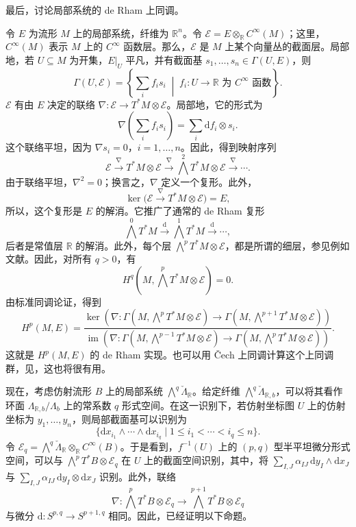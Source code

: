 最后，讨论局部系统的 de Rham 上同调。

令 $E$ 为流形 $M$ 上的局部系统，纤维为 $\mathbb R^n$。令 $\mathcal E=E\otimes_{\mathbb R}C^\infty(M)$；这里，$C^\infty(M)$ 表示 $M$ 上的 $C^\infty$ 函数层。那么，$\mathcal E$ 是 $M$ 上某个向量丛的截面层。局部地，若 $U\subseteq M$ 为开集，$E|_U$ 平凡，并有截面基 $s_1,\ldots,s_n\in\Gamma(U,E)$，则
\[
\Gamma(U,\mathcal E)=\left\{\sum_i f_i s_i\;\middle|\;
f_i\colon U\to\mathbb R\text{ 为 }C^\infty\text{ 函数}\right\}.
\]
$\mathcal E$ 有由 $E$ 决定的联络 $\nabla\colon\mathcal E\to T^*M\otimes\mathcal E$。局部地，它的形式为
\[
\nabla\!\left(\sum_i f_i s_i\right)=\sum_i\mathrm df_i\otimes s_i.
\]
这个联络平坦，因为 $\nabla s_i=0$，$i=1,\ldots,n$。因此，得到映射序列
\[
\mathcal E\xrightarrow{\nabla}T^*M\otimes\mathcal E
\xrightarrow{\nabla}\bigwedge^2T^*M\otimes\mathcal E
\xrightarrow{\nabla}\cdots.
\]
由于联络平坦，$\nabla^2=0$；换言之，$\nabla$ 定义一个复形。此外，
\[
\ker\bigl(\mathcal E\xrightarrow{\nabla}T^*M\otimes\mathcal E\bigr)=E,
\]
所以，这个复形是 $E$ 的解消。它推广了通常的 de Rham 复形
\[
\bigwedge^0T^*M\xrightarrow{\mathrm d}\bigwedge^1T^*M
\xrightarrow{\mathrm d}\cdots,
\]
后者是常值层 $\mathbb R$ 的解消。此外，每个层 $\bigwedge^pT^*M\otimes\mathcal E$，都是所谓的细层，参见例如文献。因此，对所有 $q>0$，有
\[
H^q\!\left(M,\bigwedge^pT^*M\otimes\mathcal E\right)=0.
\]
由标准同调论证，得到
\[
H^p(M,E)=
\frac{\ker\!\left(\nabla\colon\Gamma(M,\bigwedge^pT^*M\otimes\mathcal E)
\to\Gamma(M,\bigwedge^{p+1}T^*M\otimes\mathcal E)\right)}
{\operatorname{im}\!\left(\nabla\colon\Gamma(M,\bigwedge^{p-1}T^*M\otimes\mathcal E)
\to\Gamma(M,\bigwedge^pT^*M\otimes\mathcal E)\right)}.
\]
这就是 $H^p(M,E)$ 的 de Rham 实现。也可以用 Čech 上同调计算这个上同调群，见，这也将很有用。

现在，考虑仿射流形 $B$ 上的局部系统 $\bigwedge^q\check\Lambda_{\mathbb R}$。给定纤维 $\bigwedge^q\check\Lambda_{\mathbb R,b}$，可以将其看作环面 $\Lambda_{\mathbb R,b}/\Lambda_b$ 上的常系数 $q$ 形式空间。在这一识别下，若仿射坐标图 $U$ 上的仿射坐标为 $y_1,\ldots,y_n$，则局部截面基可以识别为
\[
\{\mathrm dx_{i_1}\wedge\cdots\wedge\mathrm dx_{i_q}
\mid1\leq i_1<\cdots<i_q\leq n\}.
\]
令 $\mathcal E_q=\bigwedge^q\check\Lambda_{\mathbb R}\otimes_{\mathbb R}C^\infty(B)$。于是看到，$f^{-1}(U)$ 上的 $(p,q)$ 型半平坦微分形式空间，可以与 $\bigwedge^pT^*B\otimes\mathcal E_q$ 在 $U$ 上的截面空间识别，其中，将 $\sum_{I,J}\alpha_{IJ}\,\mathrm dy_I\wedge\mathrm dx_J$ 与 $\sum_{I,J}\alpha_{IJ}\,\mathrm dy_I\otimes\mathrm dx_J$ 识别。此外，联络
\[
\nabla\colon\bigwedge^pT^*B\otimes\mathcal E_q
\longrightarrow\bigwedge^{p+1}T^*B\otimes\mathcal E_q
\]
与微分 $\mathrm d\colon S^{p,q}\to S^{p+1,q}$ 相同。因此，已经证明以下命题。


